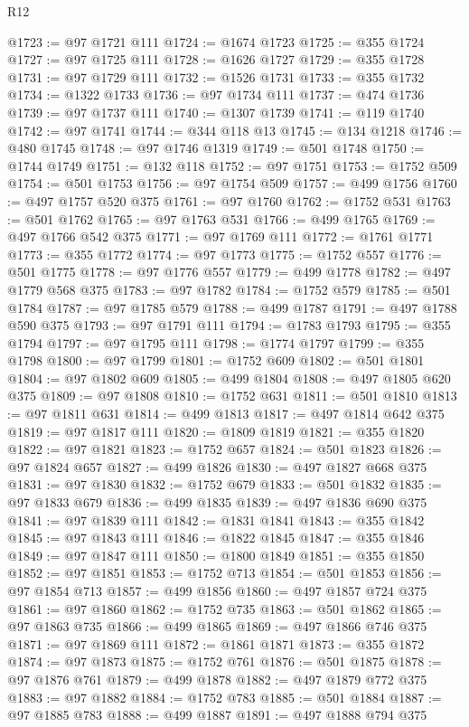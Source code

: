 \begin{lexlean}{R12}
\begin{coremodule}
@1723 := @97 @1721 @111
@1724 := @1674 @1723
@1725 := @355 @1724
@1727 := @97 @1725 @111
@1728 := @1626 @1727
@1729 := @355 @1728
@1731 := @97 @1729 @111
@1732 := @1526 @1731
@1733 := @355 @1732
@1734 := @1322 @1733
@1736 := @97 @1734 @111
@1737 := @474 @1736
@1739 := @97 @1737 @111
@1740 := @1307 @1739
@1741 := @119 @1740
@1742 := @97 @1741
@1744 := @344 @118 @13
@1745 := @134 @1218
@1746 := @480 @1745
@1748 := @97 @1746 @1319
@1749 := @501 @1748
@1750 := @1744 @1749
@1751 := @132 @118
@1752 := @97 @1751
@1753 := @1752 @509
@1754 := @501 @1753
@1756 := @97 @1754 @509
@1757 := @499 @1756
@1760 := @497 @1757 @520 @375
@1761 := @97 @1760
@1762 := @1752 @531
@1763 := @501 @1762
@1765 := @97 @1763 @531
@1766 := @499 @1765
@1769 := @497 @1766 @542 @375
@1771 := @97 @1769 @111
@1772 := @1761 @1771
@1773 := @355 @1772
@1774 := @97 @1773
@1775 := @1752 @557
@1776 := @501 @1775
@1778 := @97 @1776 @557
@1779 := @499 @1778
@1782 := @497 @1779 @568 @375
@1783 := @97 @1782
@1784 := @1752 @579
@1785 := @501 @1784
@1787 := @97 @1785 @579
@1788 := @499 @1787
@1791 := @497 @1788 @590 @375
@1793 := @97 @1791 @111
@1794 := @1783 @1793
@1795 := @355 @1794
@1797 := @97 @1795 @111
@1798 := @1774 @1797
@1799 := @355 @1798
@1800 := @97 @1799
@1801 := @1752 @609
@1802 := @501 @1801
@1804 := @97 @1802 @609
@1805 := @499 @1804
@1808 := @497 @1805 @620 @375
@1809 := @97 @1808
@1810 := @1752 @631
@1811 := @501 @1810
@1813 := @97 @1811 @631
@1814 := @499 @1813
@1817 := @497 @1814 @642 @375
@1819 := @97 @1817 @111
@1820 := @1809 @1819
@1821 := @355 @1820
@1822 := @97 @1821
@1823 := @1752 @657
@1824 := @501 @1823
@1826 := @97 @1824 @657
@1827 := @499 @1826
@1830 := @497 @1827 @668 @375
@1831 := @97 @1830
@1832 := @1752 @679
@1833 := @501 @1832
@1835 := @97 @1833 @679
@1836 := @499 @1835
@1839 := @497 @1836 @690 @375
@1841 := @97 @1839 @111
@1842 := @1831 @1841
@1843 := @355 @1842
@1845 := @97 @1843 @111
@1846 := @1822 @1845
@1847 := @355 @1846
@1849 := @97 @1847 @111
@1850 := @1800 @1849
@1851 := @355 @1850
@1852 := @97 @1851
@1853 := @1752 @713
@1854 := @501 @1853
@1856 := @97 @1854 @713
@1857 := @499 @1856
@1860 := @497 @1857 @724 @375
@1861 := @97 @1860
@1862 := @1752 @735
@1863 := @501 @1862
@1865 := @97 @1863 @735
@1866 := @499 @1865
@1869 := @497 @1866 @746 @375
@1871 := @97 @1869 @111
@1872 := @1861 @1871
@1873 := @355 @1872
@1874 := @97 @1873
@1875 := @1752 @761
@1876 := @501 @1875
@1878 := @97 @1876 @761
@1879 := @499 @1878
@1882 := @497 @1879 @772 @375
@1883 := @97 @1882
@1884 := @1752 @783
@1885 := @501 @1884
@1887 := @97 @1885 @783
@1888 := @499 @1887
@1891 := @497 @1888 @794 @375

\end{coremodule}
\end{lexlean}
